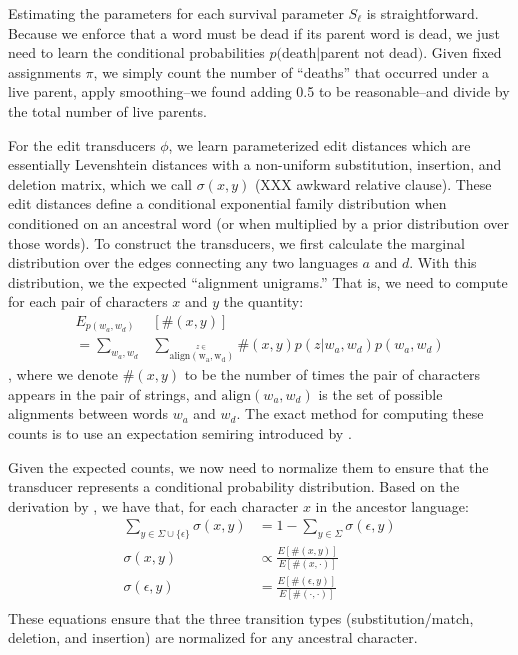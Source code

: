 \documentclass[11pt,a4paper]{article}
\begin{document}
Estimating the parameters for each survival parameter $S_\ell$ is
straightforward. Because we enforce that a word must be dead if its
parent word is dead, we just need to learn the conditional probabilities
$p($death$|$parent not dead$)$. Given fixed assignments $\pi$, we
simply count the number of ``deaths'' that occurred under a live
parent, apply smoothing--we found adding 0.5 to be reasonable--and
divide by the total number of live parents.

For the edit transducers $\phi$, we learn parameterized edit distances
which are essentially Levenshtein distances with a non-uniform
substitution, insertion, and deletion matrix, which we call
$\sigma(x,y)$ (XXX awkward relative clause). These edit distances
define a conditional exponential family distribution when conditioned
on an ancestral word (or when multiplied by a prior distribution
over those words). To construct the transducers, we first calculate
the marginal distribution over the edges connecting any two languages
$a$ and $d$. With this distribution, we the expected
``alignment unigrams.'' That is, we
need to compute for each pair of characters $x$ and $y$ the quantity:
\begin{equation}
  \begin{split}
    E_{p(w_a,w_d)}&[\#(x,y)] \\ = \sum_{w_a,w_d} &\sum_{\stackrel{z\in}{\scriptscriptstyle\mathrm{align(w_a,w_d)}}} \#(x,y) p(z|w_a,w_d)p(w_a,w_d)
   \end{split}
 \end{equation}
, where we denote $\#(x,y)$ to be the number of times the pair of characters
appears in the pair of strings, and $\mathrm{align}(w_a,w_d)$ is the set of possible
alignments between words $w_a$ and $w_d$. The exact method for computing
these counts is to use an expectation semiring introduced by
.

Given the expected counts, we now need to normalize them to ensure
that the transducer represents a conditional probability distribution.
Based on the derivation by , we have that,
for each character $x$ in the ancestor language:
\begin{equation}
  \begin{split}
    \sum_{y \in \Sigma \cup \{\epsilon\}} \sigma(x,y) &= 1 - \sum_{y \in \Sigma} \sigma(\epsilon,y) \\
    \sigma(x,y) &\propto \frac{E[\#(x,y)]}{E[\#(x,\cdot)]} \\
    \sigma(\epsilon,y) &= \frac{E[\#(\epsilon,y)]}{E[\#(\cdot,\cdot)]} \\
   \end{split}
 \end{equation}
These equations ensure that the three transition types (substitution/match,
deletion, and insertion) are normalized for any ancestral character.
\end{document}
